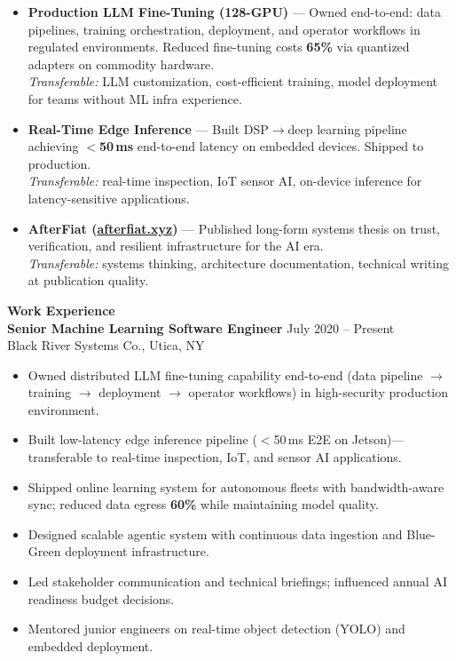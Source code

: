 \documentclass[10.5pt]{res}
\begin{document}
\begin{resume}
\begin{itemize}
    \item \textbf{Production LLM Fine-Tuning (128-GPU)} --- Owned end-to-end: data pipelines, training orchestration, deployment, and operator workflows in regulated environments. Reduced fine-tuning costs \textbf{65\%} via quantized adapters on commodity hardware.\\
    \textit{Transferable:} LLM customization, cost-efficient training, model deployment for teams without ML infra experience.

    \item \textbf{Real-Time Edge Inference} --- Built DSP$\rightarrow$deep learning pipeline achieving \textbf{$<$50\,ms} end-to-end latency on embedded devices. Shipped to production.\\
    \textit{Transferable:} real-time inspection, IoT sensor AI, on-device inference for latency-sensitive applications.

    \item \textbf{AfterFiat (\href{https://afterfiat.xyz}{afterfiat.xyz})} --- Published long-form systems thesis on trust, verification, and resilient infrastructure for the AI era.\\
    \textit{Transferable:} systems thinking, architecture documentation, technical writing at publication quality.
\end{itemize}

{\bf Work Experience} \vspace{0.27 cm} \\
{\bf Senior Machine Learning Software Engineer} \hfill July 2020 -- Present\\
Black River Systems Co., Utica, NY \\
\begin{itemize}\rightmargin=0cm \itemsep 2pt
    \item Owned distributed LLM fine-tuning capability end-to-end (data pipeline $\rightarrow$ training $\rightarrow$ deployment $\rightarrow$ operator workflows) in high-security production environment.
    \item Built low-latency edge inference pipeline ($<$50\,ms E2E on Jetson)---transferable to real-time inspection, IoT, and sensor AI applications.
    \item Shipped online learning system for autonomous fleets with bandwidth-aware sync; reduced data egress \textbf{60\%} while maintaining model quality.
    \item Designed scalable agentic system with continuous data ingestion and Blue-Green deployment infrastructure.
    \item Led stakeholder communication and technical briefings; influenced annual AI readiness budget decisions.
    \item Mentored junior engineers on real-time object detection (YOLO) and embedded deployment.
\end{itemize}


\end{resume}
\end{document}
